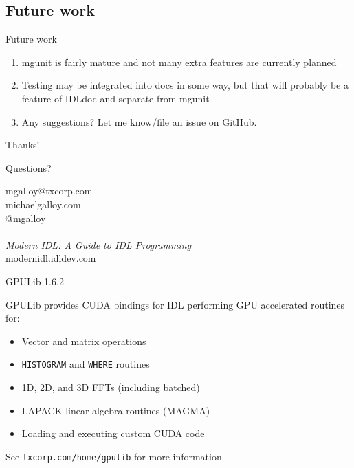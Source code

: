 \documentclass[12pt, handout]{beamer}
\begin{document}
\subsection{Future work}
\begin{frame}[t]{Future work}
  \begin{enumerate}
    \item mgunit is fairly mature and not many extra features are currently planned
    \item Testing may be integrated into docs in some way, but that will probably be a feature of IDLdoc and separate from mgunit
    \item Any suggestions? Let me know/file an issue on GitHub.
  \end{enumerate}
\end{frame}

\begin{frame}{Thanks!}
  \begin{center}

{\huge Questions?} \\

\bigskip

{mgalloy@txcorp.com} \\
{michaelgalloy.com} \\
{@mgalloy} \\
~\\
{\em Modern IDL: A Guide to IDL Programming} \\
{modernidl.idldev.com} \\


\end{center}
\end{frame}

\appendix

\begin{frame}[t]{GPULib 1.6.2}
\hypertarget{gpulib}{}

GPULib provides CUDA bindings for IDL performing GPU accelerated routines for:
\begin{itemize}
  \item Vector and matrix operations
  \item {\tt HISTOGRAM} and {\tt WHERE} routines
  \item 1D, 2D, and 3D FFTs (including batched)
  \item LAPACK linear algebra routines (MAGMA)
  \item Loading and executing custom CUDA code
\end{itemize}
See {\tt txcorp.com/home/gpulib} for more information

\hyperlink{examples}{}
\end{frame}
\end{document}
